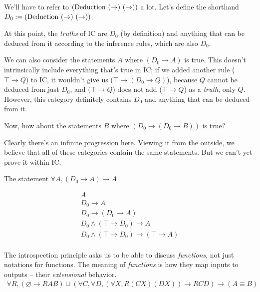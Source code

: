 \documentclass{article}
\begin{document}
  
  We'll have to refer to $(\deduction\ (\to)\ (\to))$ a lot. Let's define the shorthand $D_0 := (\operatorname{\mathrm{Deduction}}\ (\to)\ (\to))$.
  
  At this point, the \emph{truths} of IC are $D_0$ (by definition) and anything that can be deduced from it according to the inference rules, which are also $D_0$.
  
  We can also consider the statements $A$ where $(D_0 \to A)$ is true. This doesn't intrinsically include everything that's true in IC; if we added another rule ($\top \to Q$) to IC, it wouldn't give us ($\top \to (D_0 \to Q)$), because $Q$ cannot be deduced from just $D_0$, and ($\top \to Q$) does not add ($\top \to Q$) as a \emph{truth}, only $Q$. However, this category definitely contains $D_0$ and anything that can be deduced from it.
  
  Now, how about the statements $B$ where $(D_0 \to (D_0 \to B))$ is true?
  
  Clearly there's an infinite progression here. Viewing it from the outside, we believe that all of these categories contain the same statements. But we can't yet prove it within IC.
  
  The statement $\forall A, (D_0 \to A) \to A$
  
  \begin{align*}
    A\\
    D_0 \to A\\
    D_0 \to (D_0 \to A)\\
    D_0 \wedge (\top \to D_0) \to A\\
    D_0 \wedge (\top \to D_0) \to (\top \to A)\\
  \end{align*}


  The introspection principle asks us to be able to discuss \emph{functions}, not just notations for functions. The meaning of \emph{functions} is how they map inputs to outputs – their \emph{extensional} behavior.
  \begin{align*}
    \tag{extensionality}
    \forall R, (\varnothing \to R A B) \cup (\forall C,\forall D,(\forall X,R (C X) (D X)) \to R C D) \to (A \equiv B)\\
  \end{align*}
\end{document}
